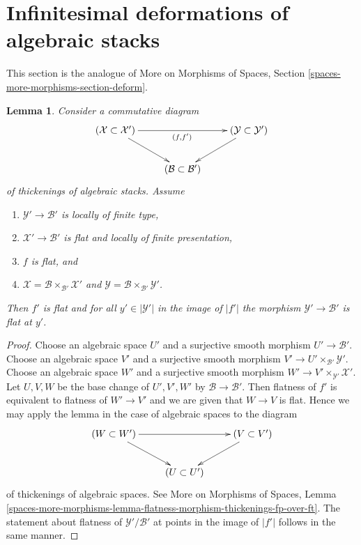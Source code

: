 \documentclass{stacks-project}
\theoremstyle{plain}
\newtheorem{lemma}[subsection]{Lemma}
\theoremstyle{definition}
\theoremstyle{remark}
\numberwithin{equation}{subsection}
\begin{document}
\section{Infinitesimal deformations of algebraic stacks}
\label{section-deform}

\noindent
This section is the analogue of
More on Morphisms of Spaces, Section
\ref{spaces-more-morphisms-section-deform}.

\begin{lemma}
\label{lemma-flatness-morphism-thickenings-fp-over-ft}
Consider a commutative diagram
$$
\xymatrix{
(\mathcal{X} \subset \mathcal{X}') \ar[rr]_{(f, f')} \ar[rd] & &
(\mathcal{Y} \subset \mathcal{Y}') \ar[ld] \\
& (\mathcal{B} \subset \mathcal{B}')
}
$$
of thickenings of algebraic stacks. Assume
\begin{enumerate}
\item $\mathcal{Y}' \to \mathcal{B}'$ is locally of finite type,
\item $\mathcal{X}' \to \mathcal{B}'$ is
flat and locally of finite presentation,
\item $f$ is flat, and
\item $\mathcal{X} = \mathcal{B} \times_{\mathcal{B}'} \mathcal{X}'$ and
$\mathcal{Y} = \mathcal{B} \times_{\mathcal{B}'} \mathcal{Y}'$.
\end{enumerate}
Then $f'$ is flat and for all $y' \in |\mathcal{Y}'|$ in the image of $|f'|$
the morphism $\mathcal{Y}' \to \mathcal{B}'$ is flat at $y'$.
\end{lemma}

\begin{proof}
Choose an algebraic space $U'$ and a surjective smooth morphism
$U' \to \mathcal{B}'$.
Choose an algebraic space $V'$ and a surjective smooth morphism
$V' \to U' \times_{\mathcal{B}'} \mathcal{Y}'$.
Choose an algebraic space $W'$ and a surjective smooth morphism
$W' \to V' \times_{\mathcal{Y}'} \mathcal{X}'$. Let $U, V, W$
be the base change of $U', V', W'$ by $\mathcal{B} \to \mathcal{B}'$.
Then flatness of $f'$ is equivalent to flatness of $W' \to V'$ and
we are given that $W \to V$ is flat. Hence we may apply the lemma
in the case of algebraic spaces to the diagram
$$
\xymatrix{
(W \subset W') \ar[rr] \ar[rd] & & (V \subset V') \ar[ld] \\
& (U \subset U')
}
$$
of thickenings of algebraic spaces. See
More on Morphisms of Spaces, Lemma
\ref{spaces-more-morphisms-lemma-flatness-morphism-thickenings-fp-over-ft}.
The statement about flatness of $\mathcal{Y}'/\mathcal{B}'$ at points in the
image of $|f'|$ follows in the same manner.
\end{proof}
\end{document}
